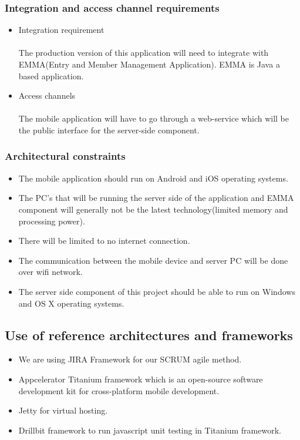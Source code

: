 \documentclass[10pt,a4paper]{article}
\begin{document}
\subsubsection{Integration and access channel requirements}
\begin{itemize}
\item Integration requirement
\paragraph{}
The production version of this application will need to integrate with EMMA(Entry and Member Management Application). EMMA is Java a based application.
\item Access channels
\paragraph{}
The mobile application will have to go through a web-service which will be the public interface for the server-side component. 
\end{itemize}
\subsubsection{Architectural constraints}
\begin{itemize}
\item The mobile application should run on Android and iOS operating systems.
\item The PC's that will be running the server side of the application and EMMA component will generally not be the latest technology(limited memory and processing power).
\item There will be limited to no internet connection.
\item The communication between the mobile device and server PC will be done over wifi network.
\item The server side component of this project should be able to run on Windows and OS X operating systems.
\end{itemize}
\subsection{Use of reference architectures and frameworks}
\begin{itemize}
\item We are using JIRA Framework for our SCRUM agile method.
\item Appcelerator Titanium framework which is an open-source software development kit for cross-platform mobile development.
\item Jetty for virtual hosting.
\item Drillbit framework to run javascript unit  testing in Titanium framework.
\end{itemize}
\end{document}
